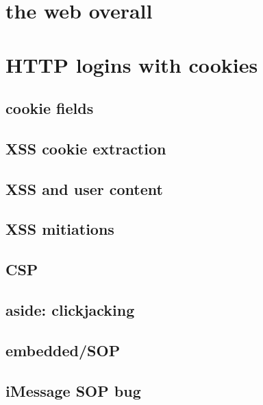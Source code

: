 
\usetikzlibrary{arrows.meta,calc,shapes.callouts,positioning}
\section{the web overall}


%
\section{HTTP logins with cookies}


\subsection{cookie fields}


\subsection{XSS cookie extraction}




\subsection{XSS and user content}


\subsection{XSS mitiations}


\subsection{CSP}


\subsection{aside: clickjacking}


\subsection{embedded/SOP}


\subsection{iMessage SOP bug}


